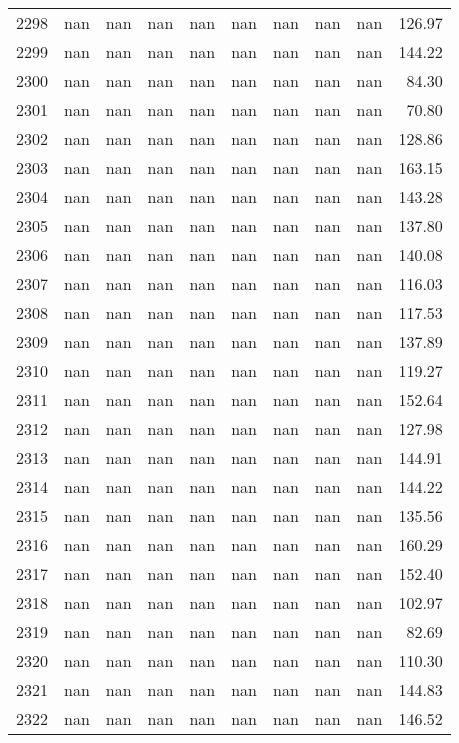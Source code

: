 \begin{tabular}{lrrrrrrrrr}
2298 & nan & nan & nan & nan & nan & nan & nan & nan & 126.97 \\
2299 & nan & nan & nan & nan & nan & nan & nan & nan & 144.22 \\
2300 & nan & nan & nan & nan & nan & nan & nan & nan & 84.30 \\
2301 & nan & nan & nan & nan & nan & nan & nan & nan & 70.80 \\
2302 & nan & nan & nan & nan & nan & nan & nan & nan & 128.86 \\
2303 & nan & nan & nan & nan & nan & nan & nan & nan & 163.15 \\
2304 & nan & nan & nan & nan & nan & nan & nan & nan & 143.28 \\
2305 & nan & nan & nan & nan & nan & nan & nan & nan & 137.80 \\
2306 & nan & nan & nan & nan & nan & nan & nan & nan & 140.08 \\
2307 & nan & nan & nan & nan & nan & nan & nan & nan & 116.03 \\
2308 & nan & nan & nan & nan & nan & nan & nan & nan & 117.53 \\
2309 & nan & nan & nan & nan & nan & nan & nan & nan & 137.89 \\
2310 & nan & nan & nan & nan & nan & nan & nan & nan & 119.27 \\
2311 & nan & nan & nan & nan & nan & nan & nan & nan & 152.64 \\
2312 & nan & nan & nan & nan & nan & nan & nan & nan & 127.98 \\
2313 & nan & nan & nan & nan & nan & nan & nan & nan & 144.91 \\
2314 & nan & nan & nan & nan & nan & nan & nan & nan & 144.22 \\
2315 & nan & nan & nan & nan & nan & nan & nan & nan & 135.56 \\
2316 & nan & nan & nan & nan & nan & nan & nan & nan & 160.29 \\
2317 & nan & nan & nan & nan & nan & nan & nan & nan & 152.40 \\
2318 & nan & nan & nan & nan & nan & nan & nan & nan & 102.97 \\
2319 & nan & nan & nan & nan & nan & nan & nan & nan & 82.69 \\
2320 & nan & nan & nan & nan & nan & nan & nan & nan & 110.30 \\
2321 & nan & nan & nan & nan & nan & nan & nan & nan & 144.83 \\
2322 & nan & nan & nan & nan & nan & nan & nan & nan & 146.52 \\

\end{tabular}
